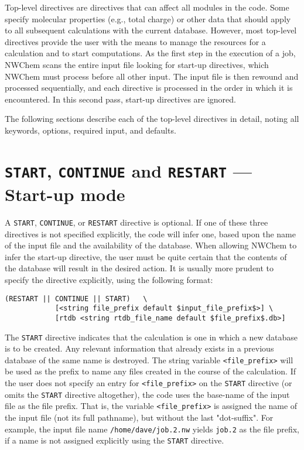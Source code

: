 \label{sec:toplevel}

Top-level directives are directives that can affect all modules in the
code.  Some specify molecular properties (e.g., total charge) or other
data that should apply to all subsequent calculations with the current
database.  However, most top-level directives provide the user with
the means to manage the resources for a calculation and to start
computations.  As the first step in the execution of a job, NWChem
scans the entire input file looking for start-up directives, which
NWChem must process before all other input.  The input file is then
rewound and processed sequentially, and each directive is processed in
the order in which it is encountered.  In this second pass, start-up
directives are ignored.

The following sections describe each of the top-level directives in
detail, noting all keywords, options, required input, and defaults.

\section{{\tt START}, {\tt CONTINUE} and {\tt RESTART} --- Start-up mode}
\label{sec:start}

A {\tt START},  {\tt CONTINUE}, or {\tt RESTART} directive is
optional.  If one of these three directives is not specified
explicitly, the code will infer one, based upon the name of the
input file and the availability of the database.  When allowing NWChem
to infer the start-up directive, the user must be quite certain that
the contents of the database will result in the desired action.  It
is usually more prudent to specify the directive explicitly, using the
following format:

\begin{verbatim}
(RESTART || CONTINUE || START)   \
            [<string file_prefix default $input_file_prefix$>] \
            [rtdb <string rtdb_file_name default $file_prefix$.db>]
\end{verbatim}

The \verb+START+ directive indicates that the calculation is one in
which a new database is to be created.  Any relevant information that
already exists in a previous database of the same name is destroyed.
The string variable {\tt <file\_prefix>} will be used as the prefix to
name any files created in the course of the calculation.  If the user
does not specify an entry for {\tt <file\_prefix>} on the \verb+START+
directive (or omits the \verb+START+ directive altogether), the code
uses the base-name of the input file as the file prefix.  That is, the
variable {\tt <file\_prefix>} is assigned the name of the input file
(not its full pathname), but without the last "dot-suffix".  For
example, the input file name \verb+/home/dave/job.2.nw+ yields
\verb+job.2+ as the file prefix, if a name is not assigned explicitly
using the \verb+START+ directive.

